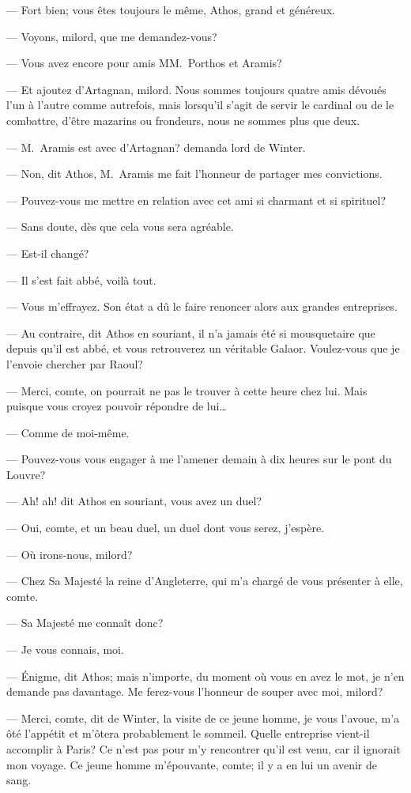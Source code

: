 — Fort bien; vous êtes toujours le même, Athos, grand et généreux.

— Voyons, milord, que me demandez-vous?

— Vous avez encore pour amis MM.~Porthos et Aramis?

— Et ajoutez d'Artagnan, milord. Nous sommes toujours quatre amis dévoués l'un à l'autre comme autrefois, mais lorsqu'il s'agit de servir le cardinal ou de le combattre, d'être mazarins ou frondeurs, nous ne sommes plus que deux.

— M.~Aramis est avec d'Artagnan? demanda lord de Winter.

— Non, dit Athos, M.~Aramis me fait l'honneur de partager mes convictions.

— Pouvez-vous me mettre en relation avec cet ami si charmant et si spirituel?

— Sans doute, dès que cela vous sera agréable.

— Est-il changé?

— Il s'est fait abbé, voilà tout.

— Vous m'effrayez. Son état a dû le faire renoncer alors aux grandes entreprises.

— Au contraire, dit Athos en souriant, il n'a jamais été si mousquetaire que depuis qu'il est abbé, et vous retrouverez un véritable Galaor. Voulez-vous que je l'envoie chercher par Raoul?

— Merci, comte, on pourrait ne pas le trouver à cette heure chez lui. Mais puisque vous croyez pouvoir répondre de lui\dots

— Comme de moi-même.

— Pouvez-vous vous engager à me l'amener demain à dix heures sur le pont du Louvre?

— Ah! ah! dit Athos en souriant, vous avez un duel?

— Oui, comte, et un beau duel, un duel dont vous serez, j'espère.

— Où irons-nous, milord?

— Chez Sa Majesté la reine d'Angleterre, qui m'a chargé de vous présenter à elle, comte.

— Sa Majesté me connaît donc?

— Je vous connais, moi.

— Énigme, dit Athos; mais n'importe, du moment où vous en avez le mot, je n'en demande pas davantage. Me ferez-vous l'honneur de souper avec moi, milord?

— Merci, comte, dit de Winter, la visite de ce jeune homme, je vous l'avoue, m'a ôté l'appétit et m'ôtera probablement le sommeil. Quelle entreprise vient-il accomplir à Paris? Ce n'est pas pour m'y rencontrer qu'il est venu, car il ignorait mon voyage. Ce jeune homme m'épouvante, comte; il y a en lui un avenir de sang.

